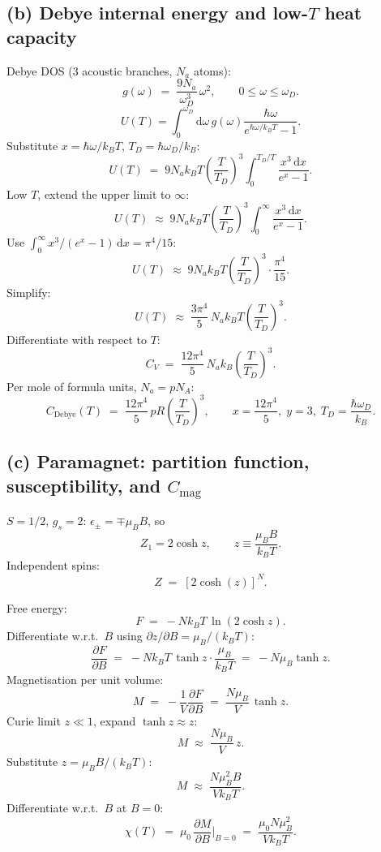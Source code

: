 \documentclass[11pt]{article}
\newcommand{\de}{\mathrm{d}}
\newcommand{\pd}[2]{\frac{\partial #1}{\partial #2}}
\begin{document}
\subsection*{(b) Debye internal energy and low-$T$ heat capacity}

Debye DOS (3 acoustic branches, $N_a$ atoms):
\begin{equation}
g(\omega) \;=\; \frac{9 N_a}{\omega_D^{3}}\,\omega^{2}, \qquad 0 \le \omega \le \omega_D.
\label{eq:gomegadebye}
\end{equation}
\[
U(T)=\int_0^{\omega_D}\de\omega\,g(\omega)\frac{\hbar\omega}{e^{\hbar\omega/k_BT}-1}.
\]
Substitute $x=\hbar\omega/k_BT$, $T_D=\hbar\omega_D/k_B$:
\[
U(T) \;=\; 9N_ak_BT\!\left(\frac{T}{T_D}\right)^3\!\!\int_0^{T_D/T}\!\!\frac{x^3\,\de x}{e^x-1}.
\]
Low $T$, extend the upper limit to $\infty$:
\[
U(T) \;\approx\; 9N_ak_BT\!\left(\frac{T}{T_D}\right)^3\!\!\int_0^{\infty}\!\!\frac{x^3\,\de x}{e^x-1}.
\]
Use $\int_0^\infty x^3/(e^x-1)\,\de x = \pi^4/15$:
\[
U(T) \;\approx\; 9N_ak_BT\!\left(\frac{T}{T_D}\right)^3\!\cdot\frac{\pi^4}{15}.
\]
Simplify:
\[
U(T) \;\approx\; \frac{3\pi^4}{5}\,N_ak_BT\!\left(\frac{T}{T_D}\right)^3.
\]
Differentiate with respect to $T$:
\[
C_V \;=\; \frac{12\pi^4}{5}\,N_ak_B\!\left(\frac{T}{T_D}\right)^3.
\]
Per mole of formula units, $N_a=pN_A$:
\begin{equation}
\boxed{\;C_{\text{Debye}}(T) \;=\; \frac{12\pi^{4}}{5}\, p R\!\left(\frac{T}{T_D}\right)^{3}, \qquad x = \frac{12\pi^{4}}{5},\; y = 3,\; T_D = \frac{\hbar\omega_D}{k_B}.\;}
\label{eq:CDbox}
\end{equation}

\subsection*{(c) Paramagnet: partition function, susceptibility, and $C_{\text{mag}}$}

$S=1/2$, $g_s=2$: $\epsilon_\pm=\mp\mu_B B$, so
\[
Z_1=2\cosh z,\qquad z\equiv\frac{\mu_B B}{k_B T}.
\]
Independent spins:
\begin{equation}
Z \;=\; [2\cosh(z)]^{N}.
\label{eq:Zspin}
\end{equation}

Free energy:
\[
F \;=\; -N k_B T\,\ln(2\cosh z).
\]
Differentiate w.r.t.\ $B$ using $\partial z/\partial B = \mu_B/(k_BT)$:
\[
\pd{F}{B} \;=\; -N k_B T\,\tanh z\cdot\frac{\mu_B}{k_BT} \;=\; -N\mu_B\tanh z.
\]
Magnetisation per unit volume:
\[
M \;=\; -\frac{1}{V}\pd{F}{B} \;=\; \frac{N\mu_B}{V}\,\tanh z.
\]
Curie limit $z\ll 1$, expand $\tanh z \approx z$:
\[
M \;\approx\; \frac{N\mu_B}{V}\,z.
\]
Substitute $z = \mu_B B/(k_BT)$:
\[
M \;\approx\; \frac{N\mu_B^{2} B}{V k_B T}.
\]
Differentiate w.r.t.\ $B$ at $B=0$:
\begin{equation}
\chi(T) \;=\; \mu_0\,\pd{M}{B}\bigg|_{B=0} \;=\; \frac{\mu_0 N \mu_B^{2}}{V k_B T}.
\label{eq:chiCurie}
\end{equation}
\end{document}
